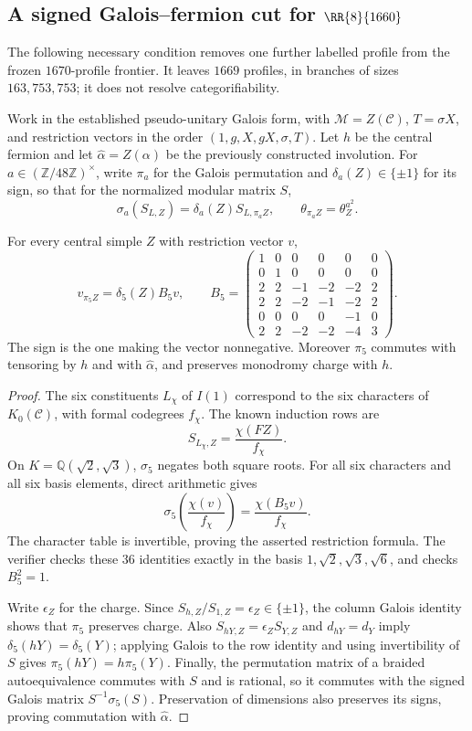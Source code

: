 \subsection{A signed Galois--fermion cut for \texorpdfstring{$\RR{8}{1660}$}{R6\_8\_1660}}
\label{subsec:r1660-signed-galois}
The following necessary condition removes one further labelled profile from
 the frozen $1670$-profile frontier.  It leaves $1669$ profiles, in branches
of sizes $163,753,753$; it does not resolve categorifiability.

Work in the established pseudo-unitary Galois form, with
$\mathcal M=Z(\mathcal C)$, $T=\sigma X$, and restriction vectors in the
order $(1,g,X,gX,\sigma,T)$.  Let $h$ be the central fermion and let
$\widehat\alpha=Z(\alpha)$ be the previously constructed involution.
For $a\in(\mathbb Z/48\mathbb Z)^\times$, write $\pi_a$ for the Galois
permutation and $\delta_a(Z)\in\{\pm1\}$ for its sign, so that for the
normalized modular matrix $S$,
\[
 \sigma_a(S_{L,Z})=\delta_a(Z)S_{L,\pi_a Z},
 \qquad \theta_{\pi_a Z}=\theta_Z^{a^2}.
\]

\begin{lemma}
For every central simple $Z$ with restriction vector $v$,
\[
 v_{\pi_5 Z}=\delta_5(Z)B_5v,\qquad
 B_5=\begin{pmatrix}
1&0&0&0&0&0\\
0&1&0&0&0&0\\
2&2&-1&-2&-2&2\\
2&2&-2&-1&-2&2\\
0&0&0&0&-1&0\\
2&2&-2&-2&-4&3
\end{pmatrix}.
\]
The sign is the one making the vector nonnegative.  Moreover $\pi_5$
commutes with tensoring by $h$ and with $\widehat\alpha$, and preserves
monodromy charge with $h$.
\end{lemma}
\begin{proof}
The six constituents $L_\chi$ of $I(1)$ correspond to the six characters
of $K_0(\mathcal C)$, with formal codegrees $f_\chi$.  The known induction
rows are
\[
 S_{L_\chi,Z}=\frac{\chi(FZ)}{f_\chi}.
\]
On $K=\mathbb Q(\sqrt2,\sqrt3)$, $\sigma_5$ negates both square roots.
For all six characters and all six basis elements, direct arithmetic gives
\[
 \sigma_5\!\left(\frac{\chi(v)}{f_\chi}\right)
       =\frac{\chi(B_5v)}{f_\chi}.
\]
The character table is invertible, proving the asserted restriction formula.
The verifier checks these $36$ identities exactly in the basis
$1,\sqrt2,\sqrt3,\sqrt6$, and checks $B_5^2=1$.

Write $\epsilon_Z$ for the charge.  Since
$S_{h,Z}/S_{1,Z}=\epsilon_Z\in\{\pm1\}$, the column Galois identity
shows that $\pi_5$ preserves charge.  Also
$S_{hY,Z}=\epsilon_ZS_{Y,Z}$ and $d_{hY}=d_Y$ imply
$\delta_5(hY)=\delta_5(Y)$; applying Galois to the row identity and
using invertibility of $S$ gives $\pi_5(hY)=h\pi_5(Y)$.
Finally, the permutation matrix of a braided autoequivalence commutes with
$S$ and is rational, so it commutes with the signed Galois matrix
$S^{-1}\sigma_5(S)$.  Preservation of dimensions also preserves its signs,
proving commutation with $\widehat\alpha$.
\end{proof}


